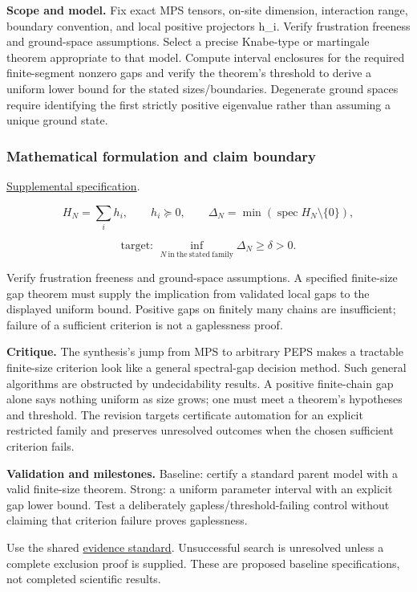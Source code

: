 \documentclass[
  11pt,
]{article}
\begin{document}
\textbf{Scope and model.} Fix exact MPS tensors, on-site dimension,
interaction range, boundary convention, and local positive projectors
h\_i. Verify frustration freeness and ground-space assumptions. Select a
precise Knabe-type or martingale theorem appropriate to that model.
Compute interval enclosures for the required finite-segment nonzero gaps
and verify the theorem's threshold to derive a uniform lower bound for
the stated sizes/boundaries. Degenerate ground spaces require
identifying the first strictly positive eigenvalue rather than assuming
a unique ground state.

\subsubsection{Mathematical formulation and claim boundary}

\href{https://github.com/rick-stevens-ai/Pure-Thought/blob/main/supplemental/S07.md}{Supplemental
specification}.

\[H_N=\sum_i h_i,\qquad h_i\succeq0,\qquad
\Delta_N=\min(\operatorname{spec}H_N\setminus\{0\}),\]

\[\text{target: }\inf_{N\ \mathrm{in\ the\ stated\ family}}\Delta_N\ge\delta>0.\]

Verify frustration freeness and ground-space assumptions. A specified
finite-size gap theorem must supply the implication from validated local
gaps to the displayed uniform bound. Positive gaps on finitely many
chains are insufficient; failure of a sufficient criterion is not a
gaplessness proof.

\textbf{Critique.} The synthesis's jump from MPS to arbitrary PEPS makes
a tractable finite-size criterion look like a general spectral-gap
decision method. Such general algorithms are obstructed by
undecidability results. A positive finite-chain gap alone says nothing
uniform as size grows; one must meet a theorem's hypotheses and
threshold. The revision targets certificate automation for an explicit
restricted family and preserves unresolved outcomes when the chosen
sufficient criterion fails.

\textbf{Validation and milestones.} Baseline: certify a standard parent
model with a valid finite-size theorem. Strong: a uniform parameter
interval with an explicit gap lower bound. Test a deliberately
gapless/threshold-failing control without claiming that criterion
failure proves gaplessness.

Use the shared
\href{https://github.com/rick-stevens-ai/Pure-Thought/blob/main/reviews/EVIDENCE-STANDARD.md}{evidence
standard}. Unsuccessful search is unresolved unless a complete exclusion
proof is supplied. These are proposed baseline specifications, not
completed scientific results.
\end{document}
